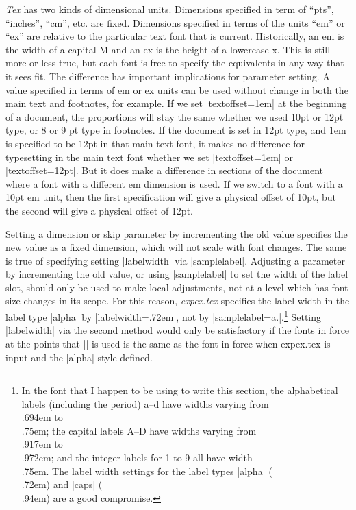 {\it Tex\/} has two kinds of dimensional units.  Dimensions
specified in term of ``pts'', ``inches'', ``cm'', etc. are fixed.
Dimensions specified in terms of the units ``em'' or ``ex'' are
relative to the particular text font that is current.
Historically, an em is the width of a capital M and an ex is the
height of a lowercase x.  This is still more or less true, but
each font is free to specify the equivalents in any way that it
sees fit.  The difference has important implications for
parameter setting.  A value specified in terms of em or ex units
can be used without change in both the main text and footnotes,
for example.  If we set |textoffset=1em| at the beginning of a
document, the proportions will stay the same whether we used 10pt
or 12pt type, or 8 or 9 pt type in footnotes.
If the document is set in 12pt type, and 1em is specified to be
12pt in that main text font, it makes no difference for
typesetting in the main text font whether we set |textoffset=1em|
or |textoffset=12pt|.  But it does make a difference in sections
of the document where a font with a different em dimension is
used.  If we switch to a font with a 10pt em unit, then the first
specification will give a physical offset of 10pt, but the second
will give a physical offset of 12pt.

Setting a dimension or skip parameter by incrementing the old
value specifies the new value as a fixed dimension, which will
not scale with font changes.  The same is true of specifying
setting |labelwidth| via |samplelabel|.  Adjusting a parameter by
incrementing the old value, or using |samplelabel| to set the
width of the label slot, should only be used to make local
adjustments, not at a level which has font size changes in its
scope.  For this reason, {\sl expex.tex\/} specifies the label width
in the label type |alpha| by |labelwidth=.72em|, not by
|samplelabel=a.|.\footnote{In the font that I happen to be using to
write this section, the alphabetical labels (including the period)
a--d have widths varying from \\.694em to \\.75em; the capital labels
A--D have widths varying from \\.917em to \\.972em; and the integer
labels for 1 to 9 all have width \\.75em. The label width settings for
the label types |alpha| (\\.72em) and |caps| (\\.94em) are a good
compromise.} Setting |labelwidth| via the second method would only be
satisfactory if the fonts in force at the points that |\pex| is
used is the same as the font in force when expex.tex is input and
the |alpha| style defined.

